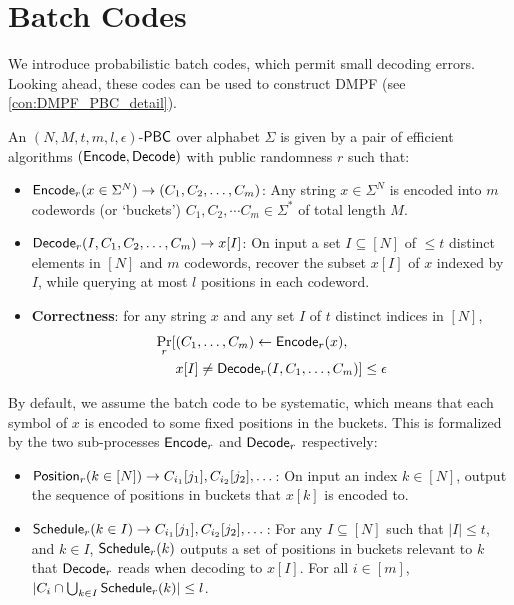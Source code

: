 \section{Batch Codes}\label{sec:batch_codes}
We introduce probabilistic batch codes, which permit small decoding errors. Looking ahead, these codes can be used to construct DMPF (see \cref{con:DMPF_PBC_detail}). 
\begin{definition}\label{def:PBC}
  An $(N,M,t,m,l,\epsilon)$-${\sf PBC}$ over alphabet $\Sigma$ is given by a pair of efficient algorithms $({\sf Encode},{\sf Decode})$ with public randomness $r$ such that:
  \begin{itemize}
    \item ${\sf Encode}_r(x\in\Sigma^N)\rightarrow (C_1,C_2,\dots,C_m)$: Any string $x\in\Sigma^N$ is encoded into $m$ codewords (or `buckets') $C_1,C_2,\cdots C_m\in\Sigma^*$ of total length $M$.
    \item ${\sf Decode}_r(I,C_1,C_2,\dots,C_m)\rightarrow x[I]$: On input a set $I\subseteq[N]$ of $\le t$ distinct elements in $[N]$ and $m$ codewords, recover the subset $x[I]$ of $x$ indexed by $I$, while querying at most $l$ positions in each codeword. 
    \item \textbf{Correctness}: for any string $x$ and any set $I$ of $t$ distinct indices in $[N]$, 
    \[
    \begin{split}
      \Pr_r[&(C_1,\dots, C_m)\gets {\sf Encode}_r(x), \\
      &x[I]\not= {\sf Decode}_r(I,C_1,\dots,C_m)] \le \epsilon
    \end{split}
    \]
  \end{itemize}
  By default, we assume the batch code to be systematic, which means that each symbol of $x$ is encoded to some fixed positions in the buckets. This is formalized by the two sub-processes ${\sf Encode}_r$ and ${\sf Decode}_r$ respectively: 
  \begin{itemize}
    \item ${\sf Position}_r(k\in[N])\rightarrow C_{i_1}[j_1],C_{i_2}[j_2],\dots$: On input an index $k\in[N]$, output the sequence of positions in buckets that $x[k]$ is encoded to. 
    \item ${\sf Schedule}_r(k\in I)\rightarrow C_{i_1}[j_1],C_{i_2}[j_2],\dots$: For any $I\subseteq [N]$ such that $|I|\le t$, and $k\in I$, ${\sf Schedule}_r(k)$ outputs a set of positions in buckets relevant to $k$ that ${\sf Decode}_r$ reads when decoding to $x[I]$. For all $i\in [m]$, $|C_i\cap \bigcup_{k\in I}{\sf Schedule}_r(k)|\le l$. 
  \end{itemize}
\end{definition}

